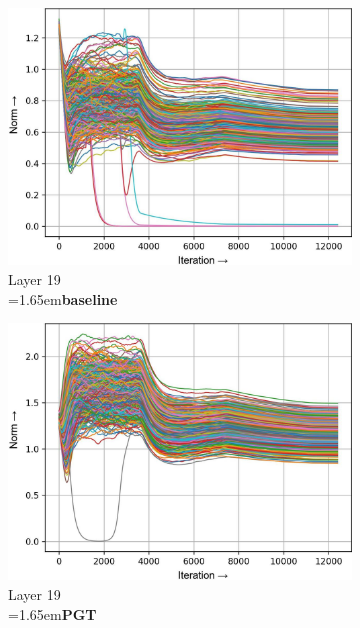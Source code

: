 \documentclass[runningheads]{llncs}
\newcommand{\forceindentb}{\parindent=1.65em\indent\parindent=0pt\relax}
\begin{document}
\begin{figure}[t]
\begin{subfigure}[t]{0.16\textwidth}
\includegraphics[width=\textwidth]{trimmed/baseline-w-layer-7-2}
\caption{Layer 19\\ \forceindentb\textbf{baseline}}
\end{subfigure}
\begin{subfigure}[t]{0.16\textwidth}
\includegraphics[width=\textwidth]{trimmed/pgt-w-layer-7-2}
\caption{Layer 19\\ \forceindentb\textbf{PGT}}
\end{subfigure}
\begin{subfigure}[t]{0.16\textwidth}

\end{subfigure}
\end{figure}
\end{document}
